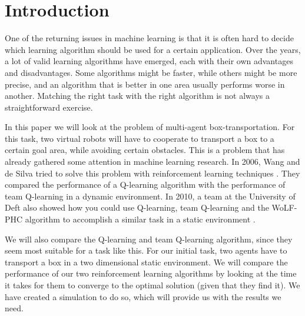 \section{Introduction}
One of the returning issues in machine learning is that it is often hard to decide which learning algorithm should be used for a certain application. Over the years, a lot of valid learning algorithms have emerged, each with their own advantages and disadvantages. Some algorithms might be faster, while others might be more precise, and an algorithm that is better in one area usually performs worse in another. Matching the right task with the right algorithm is not always a straightforward exercise.

In this paper we will look at the problem of multi-agent box-transportation.  For this task, two virtual robots will have to cooperate to transport a box to a certain goal area, while avoiding certain obstacles. This is a problem that has already gathered some attention in machine learning research. In 2006, Wang and de Silva tried to solve this problem with reinforcement learning techniques \cite{wang2006}. They compared the performance of a Q-learning algorithm with the performance of team Q-learning in a dynamic environment. In 2010, a team at the University of Deft also showed how you could use Q-learning, team Q-learning and the WoLF-PHC algorithm to accomplish a similar task in a static environment \cite{busoniu2010}.

We will also compare the Q-learning and team Q-learning algorithm, since they seem most suitable for a task like this. For our initial task, two agents have to transport a box in a two dimensional static environment. We will compare the performance of our two reinforcement learning algorithms by looking at the time it takes for them to converge to the optimal solution (given that they find it). We have created a simulation to do so, which will provide us with the results we need.
